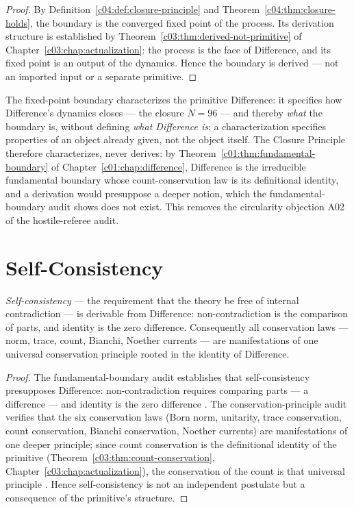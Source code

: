 \begin{proof}
By Definition~\ref{c04:def:closure-principle} and Theorem~\ref{c04:thm:closure-holds}, the boundary
is the converged fixed point of the process. Its derivation structure is established by
Theorem~\ref{c03:thm:derived-not-primitive} of Chapter~\ref{c03:chap:actualization}: the process
is the face of Difference, and its fixed point is an output of the dynamics. Hence the
boundary is derived --- not an imported input or a separate primitive.
\end{proof}

The fixed-point boundary characterizes the primitive Difference: it specifies how
Difference's dynamics closes --- the closure $N=96$ --- and thereby \emph{what} the boundary
is, without defining \emph{what Difference is}; a characterization specifies properties of
an object already given, not the object itself. The Closure Principle therefore
characterizes, never derives: by Theorem~\ref{c01:thm:fundamental-boundary} of
Chapter~\ref{c01:chap:difference}, Difference is the irreducible fundamental boundary whose
count-conservation law is its definitional identity, and a derivation would presuppose a
deeper notion, which the fundamental-boundary audit \cite{c04:QG278} shows does not exist.
This removes the circularity objection A02 of the hostile-referee audit.

\section{Self-Consistency}
\label{c04:sec:self-consistency}

\begin{theorem}
\label{c04:thm:self-consistency-presupposes}
\emph{Self-consistency} --- the requirement that the theory be free of internal contradiction
--- is derivable from Difference: non-contradiction is the comparison of parts, and identity
is the zero difference. Consequently all conservation laws --- norm, trace, count, Bianchi,
Noether currents --- are manifestations of one universal conservation principle rooted in
the identity of Difference.
\end{theorem}

\begin{proof}
The fundamental-boundary audit \cite{c04:QG278} establishes that self-consistency presupposes
Difference: non-contradiction requires comparing parts --- a difference ---
and identity is the zero difference \cite{c04:QG268}. The conservation-principle audit
\cite{c04:QG267} verifies that the six conservation laws (Born norm, unitarity, trace
conservation, count conservation, Bianchi conservation, Noether currents) are manifestations
of one deeper principle; since count conservation is the definitional identity of the
primitive (Theorem~\ref{c03:thm:count-conservation}, Chapter~\ref{c03:chap:actualization}),
the conservation of the count is that universal principle \cite{c04:QG267}. Hence
self-consistency is not an independent postulate but a consequence of the primitive's
structure.
\end{proof}

